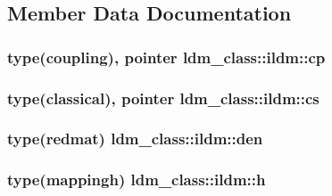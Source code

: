 \subsection{Member Data Documentation}
\hypertarget{structldm__class_1_1ildm_af25caa3ca4b3d9fc7bc6e29f39c0733f}{
\subsubsection[{cp}]{\setlength{\rightskip}{0pt plus 5cm}type(coupling), pointer ldm\+\_\+class\+::ildm\+::cp\hspace{0.3cm}{\ttfamily [private]}}}\label{structldm__class_1_1ildm_af25caa3ca4b3d9fc7bc6e29f39c0733f}
\hypertarget{structldm__class_1_1ildm_a4fda2da002e3a746461bebcb8127125b}{
\subsubsection[{cs}]{\setlength{\rightskip}{0pt plus 5cm}type(classical), pointer ldm\+\_\+class\+::ildm\+::cs\hspace{0.3cm}{\ttfamily [private]}}}\label{structldm__class_1_1ildm_a4fda2da002e3a746461bebcb8127125b}
\hypertarget{structldm__class_1_1ildm_af95bdbf6c7a5dee12767779ae3acb1ce}{
\subsubsection[{den}]{\setlength{\rightskip}{0pt plus 5cm}type({\bf redmat}) ldm\+\_\+class\+::ildm\+::den\hspace{0.3cm}{\ttfamily [private]}}}\label{structldm__class_1_1ildm_af95bdbf6c7a5dee12767779ae3acb1ce}
\hypertarget{structldm__class_1_1ildm_a9846536e7762bc561a73387ae3121c31}{
\subsubsection[{h}]{\setlength{\rightskip}{0pt plus 5cm}type({\bf mappingh}) ldm\+\_\+class\+::ildm\+::h\hspace{0.3cm}{\ttfamily [private]}}}\label{structldm__class_1_1ildm_a9846536e7762bc561a73387ae3121c31}
